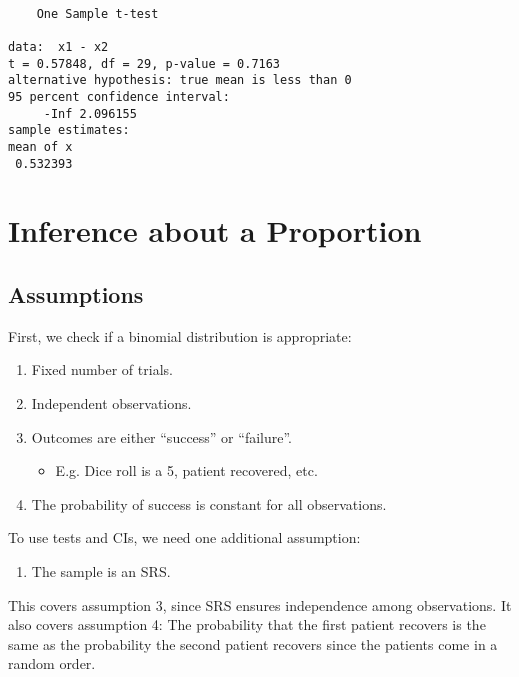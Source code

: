 \documentclass[
  letterpaper,
  DIV=11,
  numbers=noendperiod]{scrreprt}
\providecommand{\tightlist}{%
  \setlength{\itemsep}{0pt}\setlength{\parskip}{0pt}}\usepackage{longtable,booktabs,array}
\begin{document}
\begin{verbatim}

    One Sample t-test

data:  x1 - x2
t = 0.57848, df = 29, p-value = 0.7163
alternative hypothesis: true mean is less than 0
95 percent confidence interval:
     -Inf 2.096155
sample estimates:
mean of x 
 0.532393 
\end{verbatim}

\hypertarget{inference-about-a-proportion}{%
\section{Inference about a
Proportion}\label{inference-about-a-proportion}}

\hypertarget{assumptions-5}{%
\subsection{Assumptions}\label{assumptions-5}}

First, we check if a binomial distribution is appropriate:

\begin{enumerate}
\def\labelenumi{\arabic{enumi}.}
\tightlist
\item
  Fixed number of trials.
\item
  Independent observations.
\item
  Outcomes are either ``success'' or ``failure''.

  \begin{itemize}
  \tightlist
  \item
    E.g. Dice roll is a 5, patient recovered, etc.
  \end{itemize}
\item
  The probability of success is constant for all observations.
\end{enumerate}

To use tests and CIs, we need one additional assumption:

\begin{enumerate}
\def\labelenumi{\arabic{enumi}.}
\tightlist
\item
  The sample is an SRS.
\end{enumerate}

This covers assumption 3, since SRS ensures independence among
observations. It also covers assumption 4: The probability that the
first patient recovers is the same as the probability the second patient
recovers since the patients come in a random order.
\end{document}

